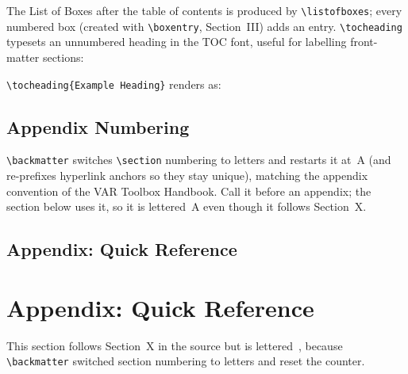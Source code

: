 \documentclass[11pt,a4paper]{article}
\begin{document}
The List of Boxes after the table of contents is produced by \verb|\listofboxes|; every numbered box (created with \verb|\boxentry|, Section~III) adds an entry. \verb|\tocheading| typesets an unnumbered heading in the TOC font, useful for labelling front-matter sections:

\begin{democode}
\tableofcontents
\listofboxes              %
\end{democode}

\noindent \verb|\tocheading{Example Heading}| renders as:


\subsection{Appendix Numbering}

\verb|\backmatter| switches \verb|\section| numbering to letters and restarts it at~A (and re-prefixes hyperlink anchors so they stay unique), matching the appendix convention of the VAR Toolbox Handbook. Call it before an appendix; the section below uses it, so it is lettered~A even though it follows Section~X.

\begin{democode}
\backmatter
\section{Appendix: Quick Reference}
\end{democode}

\backmatter
\section{Appendix: Quick Reference}

This section follows Section~X in the source but is lettered~\thesection, because \verb|\backmatter| switched section numbering to letters and reset the counter. 
\end{document}
